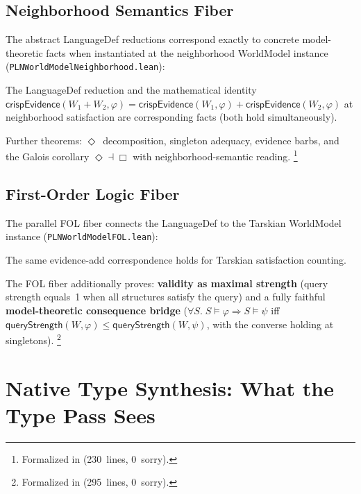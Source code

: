 \documentclass[11pt,openany]{report}
\begin{document}
\subsection{Neighborhood Semantics Fiber}

The abstract LanguageDef reductions correspond exactly to concrete
model-theoretic facts when instantiated at the neighborhood WorldModel
instance (\texttt{PLNWorldModelNeighborhood.lean}):

\begin{theorem}
The LanguageDef reduction and the mathematical identity
$\mathsf{crispEvidence}(W_1 + W_2, \varphi) =
\mathsf{crispEvidence}(W_1, \varphi) +
\mathsf{crispEvidence}(W_2, \varphi)$ at neighborhood satisfaction
are corresponding facts (both hold simultaneously).
\end{theorem}

\noindent
Further theorems: $\Diamond$~decomposition,
singleton adequacy, evidence barbs, and the Galois corollary
$\Diamond \dashv \Box$ with neighborhood-semantic reading.%
\footnote{Formalized in 
  (230~lines, 0~sorry).}

\subsection{First-Order Logic Fiber}

The parallel FOL fiber connects the LanguageDef to the Tarskian
WorldModel instance (\texttt{PLNWorldModelFOL.lean}):

\begin{theorem}
The same evidence-add correspondence holds for Tarskian satisfaction
counting.
\end{theorem}

\noindent
The FOL fiber additionally proves:
\textbf{validity as maximal strength} (query strength equals~1 when all
structures satisfy the query) and a fully faithful
\textbf{model-theoretic consequence bridge} ($\forall S.\; S \models \varphi
\Rightarrow S \models \psi$ iff
$\mathsf{queryStrength}(W, \varphi) \le \mathsf{queryStrength}(W, \psi)$,
with the converse holding at singletons).%
\footnote{Formalized in 
  (295~lines, 0~sorry).}

\section{Native Type Synthesis: What the Type Pass Sees}
\label{sec:wm-ntt-scope}
\end{document}
